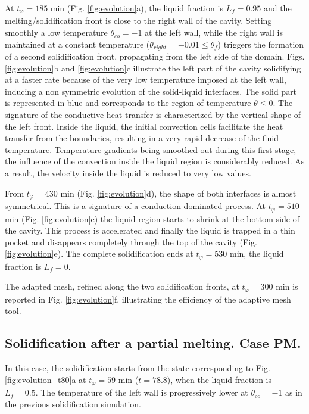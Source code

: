 At  $t_{\varphi}  =185$ min     (Fig. \ref{fig:evolution}a), the liquid fraction is $L_f=0.95$ and the melting/solidification front is close to the right wall of the cavity. 
Setting smoothly a low temperature $\theta_{co} = -1$ at the left wall, while the right wall is maintained at a constant temperature ($\theta_{right} = -0.01 \leq \theta_f$) triggers the formation of a second solidification front, propagating from the left side of the domain. 
Figs. \ref{fig:evolution}b and \ref{fig:evolution}c illustrate the left part of the cavity solidifying at a faster rate because of the very low temperature imposed at the left wall, inducing a non symmetric evolution of the solid-liquid interfaces.
The solid part is represented in blue and corresponds to the region of temperature $\theta \leq 0$.
The signature of the conductive heat transfer is characterized by the vertical shape of the left front.
Inside the liquid, the initial convection cells facilitate the heat transfer from the boundaries, resulting in a very rapid decrease of the fluid temperature. 
Temperature gradients being smoothed out during this first stage, the influence of the convection inside the liquid region is considerably reduced. As a result, the velocity inside the liquid is reduced to very low values. 

\noindent From $t_{\varphi} = 430$ min (Fig. \ref{fig:evolution}d), the shape of both interfaces is almost symmetrical. 
This is a signature of a conduction dominated process. 
At $t_{\varphi} = 510$ min (Fig. \ref{fig:evolution}e) the liquid region starts to shrink at the bottom side of the cavity. 
This process is accelerated and finally the liquid is trapped in a thin pocket and disappears completely through the top of the cavity (Fig. \ref{fig:evolution}e). 
The complete solidification ends at $t_{\varphi} = 530$ min, \ie the liquid fraction is $L_f=0$.  

\noindent The adapted mesh, refined along the two solidification fronts, at $t_{\varphi} = 300$ min is reported in Fig. \ref{fig:evolution}f, illustrating the efficiency of the adaptive mesh tool.


\subsection{Solidification after a partial melting. Case PM.} \label{sec_solid_partial} 

In this case, the solidification starts from the state corresponding to Fig. \ref{fig:evolution_t80}a at $t_{\varphi} = 59$ min ($t=78.8$), when the liquid fraction is $L_f = 0.5$. 
The temperature of the left wall is progressively lower at $\theta_{co}=-1$ as in the previous solidification simulation.  

